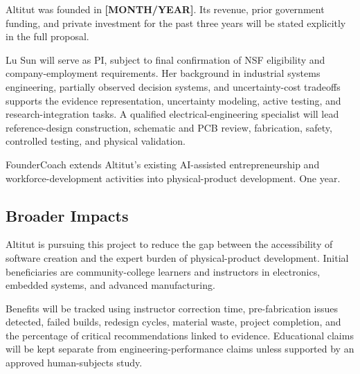 \documentclass[12pt,letterpaper]{article}
\begin{document}
Altitut was founded in \textbf{[MONTH/YEAR]}. Its revenue, prior government funding, and private investment for the past three years will be stated explicitly in the full proposal.

Lu Sun will serve as PI, subject to final confirmation of NSF eligibility and company-employment requirements. Her background in industrial systems engineering, partially observed decision systems, and uncertainty-cost tradeoffs supports the evidence representation, uncertainty modeling, active testing, and research-integration tasks. A qualified electrical-engineering specialist will lead reference-design construction, schematic and PCB review, fabrication, safety, controlled testing, and physical validation. 

FounderCoach extends Altitut's existing AI-assisted entrepreneurship and workforce-development activities into physical-product development. 
One year.


\subsection{Broader Impacts}

Altitut is pursuing this project to reduce the gap between the accessibility of software creation and the expert burden of physical-product development. Initial beneficiaries are community-college learners and instructors in electronics, embedded systems, and advanced manufacturing.

Benefits will be tracked using instructor correction time, pre-fabrication issues detected, failed builds, redesign cycles, material waste, project completion, and the percentage of critical recommendations linked to evidence. Educational claims will be kept separate from engineering-performance claims unless supported by an approved human-subjects study.
\end{document}
